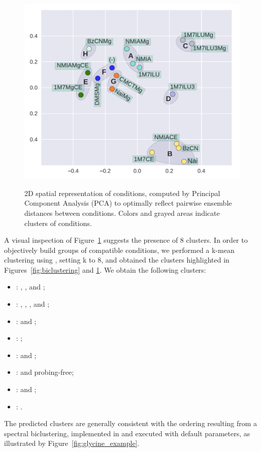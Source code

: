 \documentclass[a4,center,fleqn]{NAR}
\begin{document}
\begin{figure}
	{\centering \includegraphics[width=\linewidth]{graphs/didy/PCA}\\}%
	
	\caption{2D spatial representation of conditions, computed by Principal Component Analysis (PCA) to optimally reflect pairwise ensemble distances between conditions. Colors and grayed areas indicate clusters of conditions.}\label{fig:PCA}
\end{figure}

A visual inspection of Figure~\ref{fig:PCA} suggests the presence of 8 clusters. In order to objectively build groups of compatible conditions, we performed a k-mean clustering using , setting k to 8, and obtained the clusters highlighted in Figures~\ref{fig:biclustering} and \ref{fig:PCA}.  We obtain the following clusters:
\begin{itemize}\setlength{\itemsep}{0pt}\setlength{\parskip}{.1em}	
\item {}: \OneMSevILU, \NMIA, and \NMIAMg;
\item {}: \OneMSevCE, \NMIACE, \BzCN, and \NAICE;
\item {}: \OneMSevILUThreeMg and \OneMSevILUMg;
\item {}: \OneMSevILUThree;
\item {}: \NMIAMgCE and \OneMSevMgCE;
\item {}: \DMSMg and probing-free;
\item {}: \CMCTMg and \NAIMg;
\item {}: \BzCNMg.
\end{itemize}
The predicted clusters are generally consistent with the ordering resulting from a spectral biclustering, implemented in  and executed with default parameters, as illustrated by Figure~\ref{fig:glycine_example}. 
\end{document}
